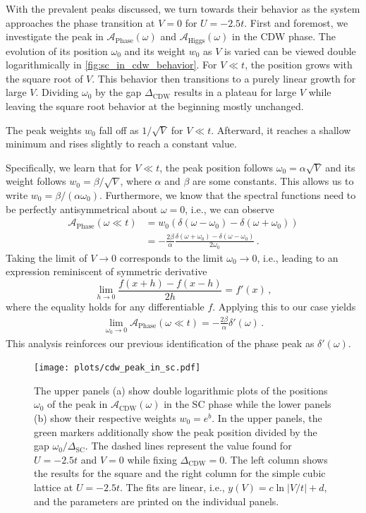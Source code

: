 \documentclass[
    reprint, 
    aps,
    preprintnumbers,
    twocolumn,
    prb,
    superscriptaddress
]{revtex4-2}
\newcommand{\spectral}[1]{\mathcal{A}_\text{#1}  (\omega)}
\begin{document}
With the prevalent peaks discussed, we turn towards their behavior as the system approaches the phase transition at $V=0$ for $U=-2.5t$.
First and foremost, we investigate the peak in $\spectral{Phase}$ and $\spectral{Higgs}$ in the CDW phase.
The evolution of its position $\omega_0$ and its weight $w_0$ as $V$ is varied can be viewed double logarithmically in \autoref{fig:sc_in_cdw_behavior}.
For $V \ll t$, the position grows with the square root of $V$. This behavior then transitions to a purely linear growth for large $V$.
Dividing $\omega_0$ by the gap $\Delta_\text{CDW}$ results in a plateau for large $V$ while leaving the square root behavior at the beginning mostly unchanged.

The peak weights $w_0$ fall off as $1/\sqrt{V}$ for $V \ll t$. 
Afterward, it reaches a shallow minimum and rises slightly to reach a constant value.

Specifically, we learn that for $V \ll t$, the peak position follows $\omega_0 = \alpha \sqrt{V}$ and its weight follows $w_0 = \beta / \sqrt{V}$, 
where $\alpha$ and $\beta$ are some constants.
This allows us to write $w_0 = \beta / (\alpha \omega_0)$. 
Furthermore, we know that the spectral functions need to be perfectly antisymmetrical about $\omega = 0$, i.e., we can observe
\begin{align}
    \mathcal{A}_\text{Phase} (\omega \ll t) &= w_0 (\delta (\omega - \omega_0) - \delta (\omega + \omega_0)) \nonumber \\
        &= - \frac{2\beta}{\alpha} \frac{\delta (\omega + \omega_0) - \delta (\omega - \omega_0)}{2\omega_0} \,.
\end{align} 
Taking the limit of $V \to 0$ corresponds to the limit $\omega_0 \to 0$, i.e., leading to an expression reminiscent of symmetric derivative
\begin{equation}
    \lim_{h \to 0} \frac{f(x + h) - f(x - h)}{2h} = f'(x)\,,
\end{equation}
where the equality holds for any differentiable $f$.
Applying this to our case yields
\begin{align}
    \lim_{\omega_0 \to 0} \mathcal{A}_\text{Phase} (\omega \ll t) = - \frac{2 \beta}{\alpha} \delta'(\omega)\,.
\end{align}
This analysis reinforces our previous identification of the phase peak as $\delta' (\omega)$.

\begin{figure}
    \centering
    \texttt{[image: plots/cdw\_peak\_in\_sc.pdf]}
    \caption{The upper panels (a) show double logarithmic plots of the positions $\omega_0$ of the peak in $\spectral{CDW}$ in the SC phase while the lower panels (b) show their respective weights $w_0 = e^{b}$.
    In the upper panels, the green markers additionally show the peak position divided by the gap $\omega_0 / \Delta_\text{SC}$.
    The dashed lines represent the value found for $U=-2.5t$ and $V=0$ while fixing $\Delta_\text{CDW}=0$.
    The left column shows the results for the square and the right column for the simple cubic lattice at $U=-2.5t$.
    The fits are linear, i.e., $y(V) = c \ln|V/t| + d$, and the parameters are printed on the individual panels.}
    \label{fig:cdw_in_sc_behavior}
\end{figure}
\end{document}
